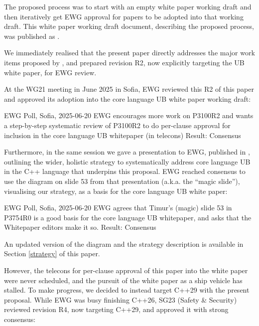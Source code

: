 The proposed process was to start with an empty white paper working draft and then iteratively get EWG approval for papers to be adopted into that working draft. This white paper working draft document, describing the proposed process, was published as \cite{P3656R1}.

We immediately realised that the present paper directly addresses the major work items proposed by \cite{P3656R1}, and prepared revision R2, now explicitly targeting the UB white paper, for EWG review.

At the WG21 meeting in June 2025 in Sofia, EWG reviewed this R2 of this paper and approved its adoption into the core language UB white paper working draft:

\vspace{2mm}
\begin{wgpoll}{{EWG Poll, Sofia, 2025-06-20}}
EWG encourages more work on P3100R2 and wants a step-by-step systematic review of P3100R2 to do per-clause approval for inclusion in the core language UB whitepaper (in telecons)
Result: Consensus
\end{wgpoll}
\vspace{2mm}

Furthermore, in the same session we gave a presentation to EWG, published in \cite{P3754R0}, outlining the wider, holistic strategy to systematically address core language UB in the C++ language that underpins this proposal. EWG reached consensus to use the diagram on slide 53 from that presentation (a.k.a. the ``magic slide''), visualising our strategy, as a basis for the core language UB white paper:

\vspace{2mm}
\begin{wgpoll}{{EWG Poll, Sofia, 2025-06-20}}
EWG agrees that Timur's (magic) slide 53 in P3754R0 is a good basis for the core language UB whitepaper, and asks that the Whitepaper editors make it so.
Result: Consensus
\end{wgpoll}
\vspace{2mm}

An updated version of the diagram and the strategy description is available in Section \ref{strategy} of this paper.

However, the telecons for per-clause approval of this paper into the white paper were never scheduled, and the pursuit of the white paper as a ship vehicle has stalled. To make progress, we decided to instead target C++29 with the present proposal. While EWG was busy finishing C++26, SG23 (Safety \& Security) reviewed revision R4, now targeting C++29, and approved it with strong consensus:

